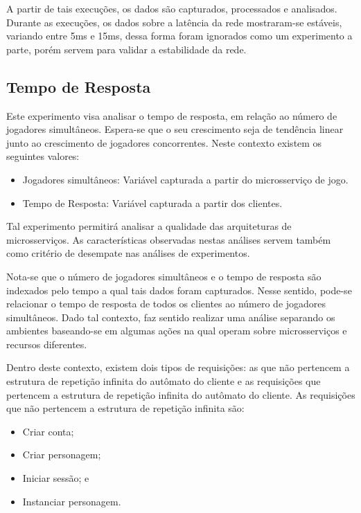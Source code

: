 A partir de tais execuções, os dados são capturados, processados e analisados.
%
Durante as execuções, os dados sobre a latência da rede mostraram-se estáveis, variando entre 5ms e 15ms, dessa forma foram ignorados como um experimento a parte, porém servem para validar a estabilidade da rede.

\subsection{Tempo de Resposta}

Este experimento visa analisar o tempo de resposta, em relação ao número de jogadores simultâneos.
%
Espera-se que o seu crescimento seja de tendência linear junto ao crescimento de jogadores concorrentes.
%
Neste contexto existem os seguintes valores:

\begin{itemize}
    \item Jogadores simultâneos: Variável capturada a partir do microsserviço de jogo.
    \item Tempo de Resposta: Variável capturada a partir dos clientes.
\end{itemize}

Tal experimento permitirá analisar a qualidade das arquiteturas de microsserviços.
%
As características observadas nestas análises servem também como critério de desempate nas análises de experimentos.

Nota-se que o número de jogadores simultâneos e o tempo de resposta são indexados pelo tempo a qual tais dados foram capturados.
%
Nesse sentido, pode-se relacionar o tempo de resposta de todos os clientes ao número de jogadores simultâneos.
%
Dado tal contexto, faz sentido realizar uma análise separando os ambientes baseando-se em algumas ações na qual operam sobre microsserviços e recursos diferentes.

Dentro deste contexto, existem dois tipos de requisições: as que não pertencem a estrutura de repetição infinita do autômato do cliente e as requisições que pertencem a estrutura de repetição infinita do autômato do cliente.
%
As requisições que não pertencem a estrutura de repetição infinita são:

\begin{itemize}
    \item Criar conta;
    \item Criar personagem;
    \item Iniciar sessão; e
    \item Instanciar personagem.
\end{itemize}

